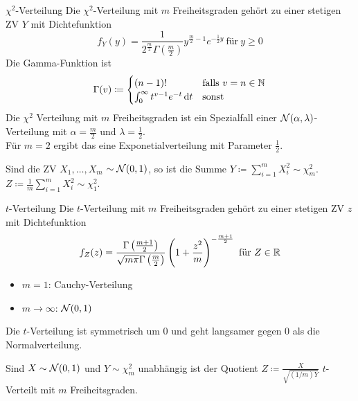 \begin{definition}{$\chi^2$-Verteilung}
	Die $\chi^2$-Verteilung mit $m$ Freiheitsgraden gehört zu einer stetigen ZV $Y$ mit Dichtefunktion
	\begin{equation*}
		f_Y (y) = \frac{1}{2^{\frac{m}{2}} \Gamma (\frac{m}{2})} y^{\frac{m}{2} -1} e^{-\frac{1}{2} y} ~\text{für}~ y \geq
		0
	\end{equation*}
	Die Gamma-Funktion ist 
	\begin{equation*}
		\Gamma (v) \coloneqq
		\begin{cases}
			(n-1)! & \text{falls} ~ v = n \in \N\\
			\int_{0}^{\infty} t^{v-1} e^{-t} \dif t & \text{sonst}
		\end{cases}
	\end{equation*}
	\tcblower
	Die $\chi^2$ Verteilung mit $m$ Freiheitsgraden ist ein Spezialfall einer $\mathcal{N}(\alpha, \lambda)$-Verteilung
	mit $\alpha = \frac{m}{2}$ und $\lambda = \frac{1}{2}$.\\
	Für $m = 2$ ergibt das eine Exponetialverteilung mit Parameter $\frac{1}{2}$.
\end{definition}
\begin{tcolorbox}[lemmacore]
	Sind die ZV $X_1 , \ldots , X_m$ \iid $\sim \mathcal{N}(0,1)$, so ist die Summe $Y \coloneqq \sum_{i=1}^{m} X_i^2 \sim
	\chi^2_m$. $Z \coloneqq \frac{1}{m} \sum_{i=1}^{m} X_i^2 \sim \chi_1^2$.
\end{tcolorbox}
\begin{definition}{$t$-Verteilung}
	Die $t$-Verteilung mit $m$ Freiheitsgraden gehört zu einer stetigen ZV $z$ mit Dichtefunktion
	\begin{equation*}
		f_Z(z) = \frac{\Gamma \left(\frac{m+1}{2} \right)}{\sqrt{m \pi} \Gamma \left( \frac{m}{2} \right)} \left( 1 +
		\frac{z^2}{m} \right)^{- \frac{m+1}{2}} ~\text{für}~Z \in \mathbb{R}
	\end{equation*}
	\begin{itemize}
		\item $m=1$: Cauchy-Verteilung
		\item $m \rightarrow \infty$: $\mathcal{N} (0,1)$
	\end{itemize}
	Die $t$-Verteilung ist symmetrisch um $0$ und geht langsamer gegen $0$ als die Normalverteilung.
\end{definition}
\begin{tcolorbox}[lemmacore]
	Sind $X \sim \mathcal{N}(0,1)$ und $Y \sim \chi_m^2$ unabhängig ist der Quotient $Z \coloneqq \frac{X}{\sqrt{(1/m)Y}}$
	$t$-Verteilt mit $m$ Freiheitsgraden. 
\end{tcolorbox}
